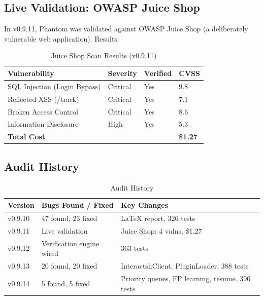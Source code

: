 \documentclass[12pt,a4paper]{article}
\begin{document}
\subsection{Live Validation: OWASP Juice Shop}

In v0.9.11, Phantom was validated against OWASP Juice Shop (a deliberately
vulnerable web application). Results:

\begin{table}[H]
\centering
\begin{tabular}{llll}
\toprule
\textbf{Vulnerability} & \textbf{Severity} & \textbf{Verified} & \textbf{CVSS} \\
\midrule
SQL Injection (Login Bypass) & Critical & Yes & 9.8 \\
Reflected XSS (/track)      & Critical & Yes & 7.1 \\
Broken Access Control        & Critical & Yes & 8.6 \\
Information Disclosure       & High     & Yes & 5.3 \\
\midrule
\multicolumn{3}{l}{\textbf{Total Cost}} & \textbf{\$1.27} \\
\bottomrule
\end{tabular}
\caption{Juice Shop Scan Results (v0.9.11)}
\end{table}

\subsection{Audit History}

\begin{table}[H]
\centering
\begin{tabular}{lll}
\toprule
\textbf{Version} & \textbf{Bugs Found / Fixed} & \textbf{Key Changes} \\
\midrule
v0.9.10 & 47 found, 23 fixed & LaTeX report, 326 tests \\
v0.9.11 & Live validation      & Juice Shop: 4 vulns, \$1.27 \\
v0.9.12 & Verification engine wired & 363 tests \\
v0.9.13 & 20 found, 20 fixed  & InteractshClient, PluginLoader. 388 tests \\
v0.9.14 & 5 found, 5 fixed    & Priority queues, FP learning, resume. 396 tests \\
\bottomrule
\end{tabular}
\caption{Audit History}
\end{table}

\end{document}
